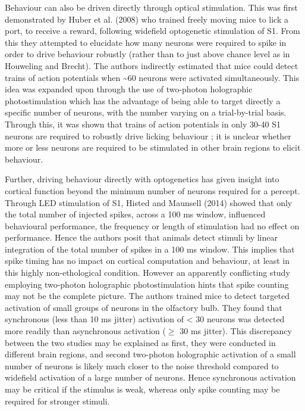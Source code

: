 Behaviour can also be driven directly through optical stimulation. This was first demonstrated by Huber et al. (2008) \cite{huber_sparse_2008} who trained freely moving mice to lick a port, to receive a reward, following widefield optogenetic stimulation of S1. From this they attempted to elucidate how many neurons were required to spike in order to drive behaviour robustly (rather than to just above chance level as in Houweling and Brecht). The authors indirectly estimated that mice could detect trains of action potentials when \textasciitilde 60 neurons were activated simultaneously. This idea was expanded upon through the use of two-photon holographic photostimulation which has the advantage of being able to target directly a specific number of neurons, with the number varying on a trial-by-trial basis. Through this, it was shown that trains of action potentials in only 30-40 S1 neurons are required to robustly drive licking behaviour \cite{dalgleish_how_2020}; it is unclear whether more or less neurons are required to be stimulated in other brain regions to elicit behaviour. 

Further, driving behaviour directly with optogenetics has given insight into cortical function beyond the minimum number of neurons required for a percept. Through LED stimulation of S1, Histed and Maunsell (2014) \cite{histed_cortical_2014} showed that only the total number of injected spikes, across a 100 ms window, influenced behavioural performance, the frequency or length of stimulation had no effect on performance. Hence the authors posit that animals detect stimuli by linear integration of the total number of spikes in a 100 ms window. This implies that spike timing has no impact on cortical computation and behaviour, at least in this highly non-ethological condition. However an apparently conflicting study \cite{gill_precise_2020} employing two-photon holographic photostimulation hints that spike counting may not be the complete picture. The authors trained mice to detect targeted activation of small groups of neurons in the olfactory bulb. They found that synchronous (less than 10 ms jitter) activation of < 30 neurons was detected more readily than asynchronous activation ($\geqslant$ 30 ms jitter). This discrepancy between the two studies may be explained as first, they were conducted in different brain regions, and second two-photon holographic activation of a small number of neurons is likely much closer to the noise threshold compared to widefield activation of a large number of neurons. Hence synchronous activation may be critical if the stimulus is weak, whereas only spike counting may be required for stronger stimuli.

